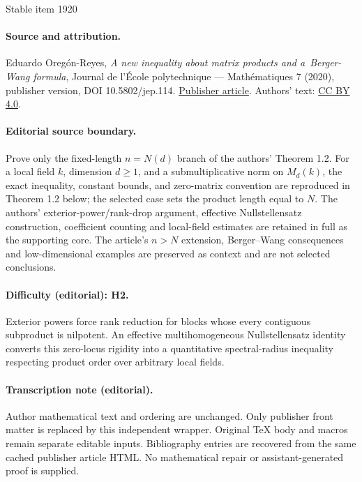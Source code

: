 \documentclass[11pt]{article}
\theoremstyle{plain}
\theoremstyle{definition}
\begin{document}
\begin{center}{\Large Stable item 1920}\end{center}
\paragraph{Source and attribution.}
Eduardo Oregón-Reyes, \emph{A new inequality about matrix products and a Berger-Wang formula}, Journal de l’École polytechnique — Mathématiques 7 (2020), publisher version, DOI 10.5802/jep.114. \href{https://jep.centre-mersenne.org/articles/10.5802/jep.114/}{Publisher article}. Authors' text: \href{https://creativecommons.org/licenses/by/4.0/}{CC BY 4.0}.
\paragraph{Editorial source boundary.}
Prove only the fixed-length \(n=N(d)\) branch of the authors' Theorem 1.2. For a local field \(k\), dimension \(d\ge1\), and a submultiplicative norm on \(M_d(k)\), the exact inequality, constant bounds, and zero-matrix convention are reproduced in Theorem 1.2 below; the selected case sets the product length equal to \(N\). The authors' exterior-power/rank-drop argument, effective Nullstellensatz construction, coefficient counting and local-field estimates are retained in full as the supporting core. The article's \(n>N\) extension, Berger--Wang consequences and low-dimensional examples are preserved as context and are not selected conclusions.
\paragraph{Difficulty (editorial): H2.}
Exterior powers force rank reduction for blocks whose every contiguous subproduct is nilpotent. An effective multihomogeneous Nullstellensatz identity converts this zero-locus rigidity into a quantitative spectral-radius inequality respecting product order over arbitrary local fields.
\paragraph{Transcription note (editorial).}
Author mathematical text and ordering are unchanged. Only publisher front matter is replaced by this independent wrapper. Original TeX body and macros remain separate editable inputs. Bibliography entries are recovered from the same cached publisher article HTML. No mathematical repair or assistant-generated proof is supplied.
\clearpage
\end{document}

